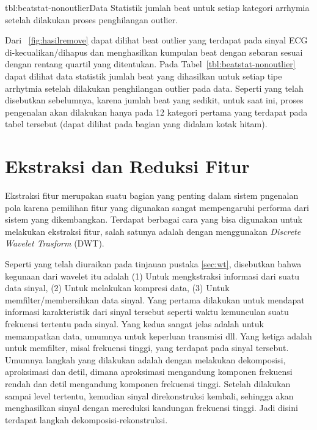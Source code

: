 {tbl:beatstat-nonoutlier}{Data Statistik jumlah beat untuk setiap  kategori
arrhymia setelah dilakukan proses penghilangan outlier.}

Dari \pic~\ref{fig:hasilremove} dapat dilihat beat outlier yang terdapat pada
sinyal ECG di-kecualikan/dihapus dan menghasilkan kumpulan beat dengan sebaran
sesuai dengan rentang quartil yang ditentukan. Pada
Tabel~\ref{tbl:beatstat-nonoutlier} dapat dilihat data statistik jumlah beat
yang dihasilkan untuk setiap tipe arrhytmia setelah dilakukan penghilangan outlier
pada data. Seperti yang telah disebutkan sebelumnya, karena jumlah beat yang
sedikit, untuk saat ini, proses pengenalan akan dilakukan hanya pada 12 kategori
pertama yang terdapat pada tabel tersebut (dapat dilihat pada bagian yang
didalam kotak hitam).



\section{Ekstraksi dan Reduksi Fitur}
\label{sec:ekstrakwt}
Ekstraksi fitur merupakan suatu bagian yang penting dalam sistem pngenalan pola
karena pemilihan fitur yang digunakan sangat mempengaruhi performa dari sistem
yang dikembangkan. Terdapat berbagai cara yang bisa digunakan untuk melakukan
ekstraksi fitur, salah satunya adalah dengan menggunakan \emph{Discrete Wavelet
Trasform} (DWT). 

Seperti yang telah diuraikan pada tinjauan pustaka \ref{sec:wt}, disebutkan
bahwa kegunaan dari wavelet itu adalah (1) Untuk mengkstraksi informasi dari
suatu data sinyal, (2) Untuk melakukan kompresi data, (3) Untuk
memfilter/membersihkan data sinyal. Yang pertama dilakukan untuk mendapat
informasi karakteristik dari sinyal tersebut seperti waktu kemunculan suatu
frekuensi tertentu pada sinyal. Yang kedua sangat jelas adalah untuk memampatkan
data, umumnya untuk keperluan transmisi dll. Yang ketiga adalah untuk memfilter,
misal frekuensi tinggi, yang terdapat pada sinyal tersebut. Umumnya langkah yang
dilakukan adalah dengan melakukan dekomposisi, aproksimasi dan detil, dimana
aproksimasi mengandung komponen frekuensi rendah dan detil mengandung komponen
frekuensi tinggi. Setelah dilakukan sampai level tertentu, kemudian sinyal
direkonstruksi kembali, sehingga akan menghasilkan sinyal dengan mereduksi
kandungan frekuensi tinggi. Jadi disini terdapat langkah
dekomposisi-rekonstruksi.


